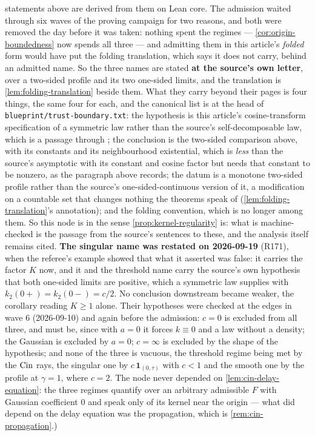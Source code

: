 \begin{proposition}
{statements above are derived from them on Lean core. The admission waited through six waves of
the proving campaign for two reasons, and both were removed the day before it was taken: nothing
spent the regimes --- \ref{cor:origin-boundedness} now spends all three --- and admitting them in
this article's \emph{folded} form would have put the folding translation, which  says
it does not carry, behind an admitted name. So the three names are stated \textbf{at the source's
own letter}, over a two-sided profile and its two one-sided limits, and the translation is
\ref{lem:folding-translation} beside them. What they carry beyond their pages is four things,
the same four for each, and the canonical list is at the head of
\texttt{blueprint/trust-boundary.txt}: the hypothesis is this article's cosine-transform
specification of a symmetric law rather than the source's self-decomposable law, which is a
passage through ; the conclusion is the two-sided comparison above, with its constants
and its neighbourhood existential, which is \emph{less} than the source's asymptotic with its
constant and cosine factor but needs that constant to be nonzero, as the paragraph above records;
the datum is a monotone two-sided profile rather than the source's one-sided-continuous version of
it, a modification on a countable set that changes nothing the theorems speak of
(\ref{lem:folding-translation}'s annotation); and the folding convention, which is no longer among
them. So this
node is \leanok{} in the sense \ref{prop:kernel-regularity} is: what is machine-checked is the
passage from the source's sentences to these, and the analysis itself remains cited.
\textbf{The singular name was restated on 2026-09-19} (R171), when the referee's example showed
that what it asserted was false: it carries the factor $K$ now, and it and the threshold name carry
the source's own hypothesis that both one-sided limits are positive, which a symmetric law supplies
with $k_2(0{+}) = k_2(0{-}) = c/2$. No conclusion downstream became weaker, the corollary reading
$K \ge 1$ alone. Their
hypotheses were checked at the edges in wave 6 (2026-09-10) and again before the admission:
$c = 0$ is excluded from all three, and must be, since with $a = 0$ it forces $k \equiv 0$ and a
law without a density; the Gaussian is excluded by $a = 0$; $c = \infty$ is excluded by the shape
of the hypothesis; and none of the three is vacuous, the threshold regime being met by the $\operatorname{Cin}$
rays, the singular one by $c\,\mathbf 1_{(0,\tau)}$ with $c < 1$ and the smooth one by the
\Matern{} profile at $\gamma = 1$, where $c = 2$. The node never depended on
\ref{lem:cin-delay-equation}: the three regimes quantify over an arbitrary admissible $F$ with
Gaussian coefficient $0$ and speak only of its kernel near the origin --- what did depend on the
delay equation was the propagation, which is \ref{rem:cin-propagation}.)}
\end{proposition}

